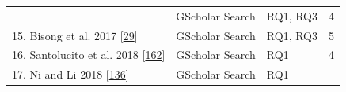 \documentclass[]{book}
\begin{document}
\begin{longtable}[]{@{}llll@{}}
\begin{minipage}[t]{0.48\columnwidth}
\end{minipage} & \begin{minipage}[t]{0.20\columnwidth}\raggedright\strut
GScholar Search\strut
\end{minipage} & \begin{minipage}[t]{0.14\columnwidth}\raggedright\strut
RQ1, RQ3\strut
\end{minipage} & \begin{minipage}[t]{0.06\columnwidth}\raggedright\strut
4\strut
\end{minipage}\tabularnewline
\begin{minipage}[t]{0.48\columnwidth}\raggedright\strut
15. Bisong et al. 2017
{[}\protect\hyperlink{ref-bisong2017built}{29}{]}\strut
\end{minipage} & \begin{minipage}[t]{0.20\columnwidth}\raggedright\strut
GScholar Search\strut
\end{minipage} & \begin{minipage}[t]{0.14\columnwidth}\raggedright\strut
RQ1, RQ3\strut
\end{minipage} & \begin{minipage}[t]{0.06\columnwidth}\raggedright\strut
5\strut
\end{minipage}\tabularnewline
\begin{minipage}[t]{0.48\columnwidth}\raggedright\strut
16. Santolucito et al. 2018
{[}\protect\hyperlink{ref-santolucito2018statically}{162}{]}\strut
\end{minipage} & \begin{minipage}[t]{0.20\columnwidth}\raggedright\strut
GScholar Search\strut
\end{minipage} & \begin{minipage}[t]{0.14\columnwidth}\raggedright\strut
RQ1\strut
\end{minipage} & \begin{minipage}[t]{0.06\columnwidth}\raggedright\strut
4\strut
\end{minipage}\tabularnewline
\begin{minipage}[t]{0.48\columnwidth}\raggedright\strut
17. Ni and Li 2018 {[}\protect\hyperlink{ref-ni2018acona}{136}{]}\strut
\end{minipage} & \begin{minipage}[t]{0.20\columnwidth}\raggedright\strut
GScholar Search\strut
\end{minipage} & \begin{minipage}[t]{0.14\columnwidth}\raggedright\strut
RQ1\strut
\end{minipage} & \begin{minipage}[t]{0.06\columnwidth}\raggedright\strut

\end{minipage}
\end{longtable}
\end{document}
